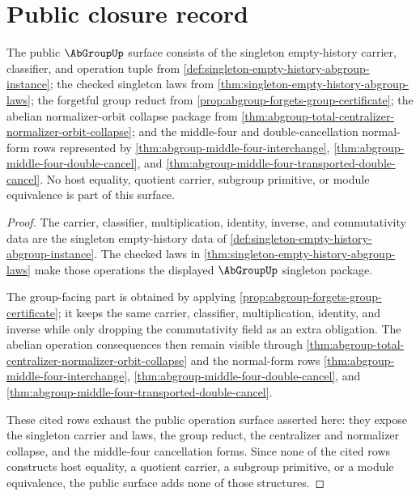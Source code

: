 \section{Public closure record}
\label{sec:abgroup-public-closure-record}

\begin{theorem}
\label{thm:abgroup-public-operation-surface}
The public $\AbGroupUp$ surface consists of the singleton empty-history carrier,
classifier, and operation tuple from
\autoref{def:singleton-empty-history-abgroup-instance}; the checked singleton
laws from \autoref{thm:singleton-empty-history-abgroup-laws}; the forgetful
group reduct from \autoref{prop:abgroup-forgets-group-certificate}; the
abelian normalizer-orbit collapse package from
\autoref{thm:abgroup-total-centralizer-normalizer-orbit-collapse}; and the
middle-four and double-cancellation normal-form rows represented by
\autoref{thm:abgroup-middle-four-interchange},
\autoref{thm:abgroup-middle-four-double-cancel}, and
\autoref{thm:abgroup-middle-four-transported-double-cancel}. No host equality,
quotient carrier, subgroup primitive, or module equivalence is part of this
surface.
\end{theorem}
\begin{proof}
The carrier, classifier, multiplication, identity, inverse, and commutativity
data are the singleton empty-history data of
\autoref{def:singleton-empty-history-abgroup-instance}. The checked laws in
\autoref{thm:singleton-empty-history-abgroup-laws} make those operations the
displayed $\AbGroupUp$ singleton package.

The group-facing part is obtained by applying
\autoref{prop:abgroup-forgets-group-certificate}; it keeps the same carrier,
classifier, multiplication, identity, and inverse while only dropping the
commutativity field as an extra obligation. The abelian operation consequences
then remain visible through
\autoref{thm:abgroup-total-centralizer-normalizer-orbit-collapse} and the
normal-form rows
\autoref{thm:abgroup-middle-four-interchange},
\autoref{thm:abgroup-middle-four-double-cancel}, and
\autoref{thm:abgroup-middle-four-transported-double-cancel}.

These cited rows exhaust the public operation surface asserted here: they
expose the singleton carrier and laws, the group reduct, the centralizer and
normalizer collapse, and the middle-four cancellation forms. Since none of the
cited rows constructs host equality, a quotient carrier, a subgroup primitive,
or a module equivalence, the public surface adds none of those structures.
\end{proof}

